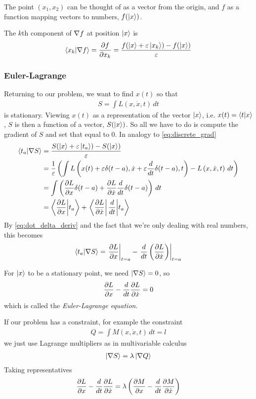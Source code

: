 \documentclass[12pt, oneside, letterpaper, fleqn]{article}
\newcommand{\eps}{\varepsilon}
\begin{document}
The point $(x_1, x_2)$ can be thought of as a vector from the origin, and
$f$ as a function mapping vectors to numbers, $f(\left\lvert x\right\rangle)$.

The $k$th component of $\nabla f$ at position $\left\lvert x\right\rangle$ is
\begin{align}\label{eq:discrete_grad}
\braket{x_k}{\grad f} = \pd{f}{x_k} = \frac{f(\ket{x} + \eps\ket{x_k}) - f(\ket{x})}{\eps}
\end{align}

\subsubsection{Euler-Lagrange}
Returning to our problem, we want to find $x(t)$ so that
\begin{align}
S = \int L\left(x, \dot{x}, t\right)\,dt
\end{align}
is stationary. Viewing $x(t)$ as a representation of the vector
$\left\lvert x\right\rangle$, i.e. $x(t) = \left\langle t\middle\vert x\right\rangle$, $S$ is then a function of a
vector, $S(\left\lvert x\right\rangle)$. So all we have to do is compute the gradient of
$S$ and set that equal to $0$. In analogy to \eqref{eq:discrete_grad}
\begin{align*}
\braket{t_a}{\grad S} &= \frac{S(\ket{x} + \eps\ket{t_a}) -
S(\ket{x})}{\eps}\\
&= \frac{1}{\eps}\left(\int L\left(x(t) + \eps\delta(t-a), \dot{x} +
\eps\odt{}\delta(t-a), t\right) - L\left(x, \dot{x},
t\right)\,dt\right)\\
&= \int \left(\pdx{L} \delta(t-a) + \pd{L}{\dot{x}} \odt{}\delta(t-a)
\right)\,dt\\
&= \braket{\pdx{L}}{t_a} +
\left.\bra{\pd{L}{\dot{x}}}\odt{}\middle\lvert t_a
\right\rangle
\end{align*}
By \eqref{eq:dot_delta_deriv} and the fact that we're only dealing with
real numbers, this becomes
\begin{align*}
\left\langle t_a\middle\vert\nabla S\right\rangle = \left.\frac{\partial L}{\partial x}\right\rvert_{t=a} -
\left.\frac{d }{dt}\left(\frac{\partial L}{\partial \dot{x}}\right)\right\rvert_{t=a}
\end{align*}

For $\left\lvert x\right\rangle$ to be a stationary point, we need $\left\lvert\nabla S\right\rangle = 0$, so
\begin{align}
\frac{\partial L}{\partial x} - \frac{d }{dt}\frac{\partial L}{\partial \dot{x}} = 0
\end{align}
which is called the \emph{Euler-Lagrange equation}.

If our problem has a constraint, for example the constraint
\begin{align*}
Q = \int M(x, \dot{x}, t)\,dt = l
\end{align*}
we just use Lagrange multipliers as in multivariable calculus
\begin{align}
\left\lvert\nabla S\right\rangle = \lambda \left\lvert\nabla{Q}\right\rangle
\end{align}
Taking representatives
\begin{align}
\frac{\partial L}{\partial x} - \frac{d }{dt}\frac{\partial L}{\partial \dot{x}} = \lambda \left(\frac{\partial M}{\partial x} -
\frac{d }{dt}\frac{\partial M}{\partial \dot{x}}\right)
\end{align}
\end{document}
